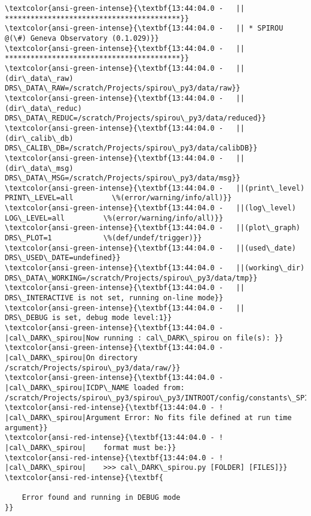 \documentclass[11pt]{article}
\begin{document}
    \begin{Verbatim}[commandchars=\\\{\}]
\textcolor{ansi-green-intense}{\textbf{13:44:04.0 -   || *****************************************}}
\textcolor{ansi-green-intense}{\textbf{13:44:04.0 -   || * SPIROU @(\#) Geneva Observatory (0.1.029)}}
\textcolor{ansi-green-intense}{\textbf{13:44:04.0 -   || *****************************************}}
\textcolor{ansi-green-intense}{\textbf{13:44:04.0 -   ||(dir\_data\_raw)      DRS\_DATA\_RAW=/scratch/Projects/spirou\_py3/data/raw}}
\textcolor{ansi-green-intense}{\textbf{13:44:04.0 -   ||(dir\_data\_reduc)    DRS\_DATA\_REDUC=/scratch/Projects/spirou\_py3/data/reduced}}
\textcolor{ansi-green-intense}{\textbf{13:44:04.0 -   ||(dir\_calib\_db)      DRS\_CALIB\_DB=/scratch/Projects/spirou\_py3/data/calibDB}}
\textcolor{ansi-green-intense}{\textbf{13:44:04.0 -   ||(dir\_data\_msg)      DRS\_DATA\_MSG=/scratch/Projects/spirou\_py3/data/msg}}
\textcolor{ansi-green-intense}{\textbf{13:44:04.0 -   ||(print\_level)       PRINT\_LEVEL=all         \%(error/warning/info/all)}}
\textcolor{ansi-green-intense}{\textbf{13:44:04.0 -   ||(log\_level)         LOG\_LEVEL=all         \%(error/warning/info/all)}}
\textcolor{ansi-green-intense}{\textbf{13:44:04.0 -   ||(plot\_graph)        DRS\_PLOT=1            \%(def/undef/trigger)}}
\textcolor{ansi-green-intense}{\textbf{13:44:04.0 -   ||(used\_date)         DRS\_USED\_DATE=undefined}}
\textcolor{ansi-green-intense}{\textbf{13:44:04.0 -   ||(working\_dir)       DRS\_DATA\_WORKING=/scratch/Projects/spirou\_py3/data/tmp}}
\textcolor{ansi-green-intense}{\textbf{13:44:04.0 -   ||                    DRS\_INTERACTIVE is not set, running on-line mode}}
\textcolor{ansi-green-intense}{\textbf{13:44:04.0 -   ||                    DRS\_DEBUG is set, debug mode level:1}}
\textcolor{ansi-green-intense}{\textbf{13:44:04.0 -   |cal\_DARK\_spirou|Now running : cal\_DARK\_spirou on file(s): }}
\textcolor{ansi-green-intense}{\textbf{13:44:04.0 -   |cal\_DARK\_spirou|On directory /scratch/Projects/spirou\_py3/data/raw/}}
\textcolor{ansi-green-intense}{\textbf{13:44:04.0 -   |cal\_DARK\_spirou|ICDP\_NAME loaded from: /scratch/Projects/spirou\_py3/spirou\_py3/INTROOT/config/constants\_SPIROU.py}}
\textcolor{ansi-red-intense}{\textbf{13:44:04.0 - ! |cal\_DARK\_spirou|Argument Error: No fits file defined at run time argument}}
\textcolor{ansi-red-intense}{\textbf{13:44:04.0 - ! |cal\_DARK\_spirou|    format must be:}}
\textcolor{ansi-red-intense}{\textbf{13:44:04.0 - ! |cal\_DARK\_spirou|    >>> cal\_DARK\_spirou.py [FOLDER] [FILES]}}
\textcolor{ansi-red-intense}{\textbf{

	Error found and running in DEBUG mode
}}

    \end{Verbatim}
\end{document}
